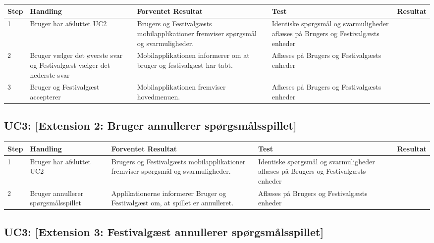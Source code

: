 \begin{longtable}{| p{0.7cm}  | p{3cm}  | p{4cm} |  p{3cm}  | p{3cm}  |}
\hline
Step & Handling & Forventet Resultat & Test & Resultat \\
\hline
1 &  Bruger har afsluttet UC2  &  Brugers og Festivalgæsts mobilapplikationer fremviser spørgsmål og svarmuligheder. & Identiske spørgsmål og svarmuligheder aflæses på Brugers og Festivalgæsts enheder & \FuckingHuge{\checkmark}\\
\hline
2 &  Bruger vælger det øverste svar og Festivalgæst vælger det nederste svar  & Mobilapplikationen informerer om at bruger og festivalgæst har tabt. & Aflæses på Brugers og Festivalgæsts enheder &  \FuckingHuge{\checkmark} \\
\hline
3 &  Bruger og Festivalgæst accepterer  & Mobilapplikationen fremviser hovedmenuen. & Aflæses på Brugers og Festivalgæsts enheder & \FuckingHuge{\checkmark} \\
\hline
\end{longtable}

\subsection{UC3: [Extension 2: Bruger annullerer spørgsmålsspillet]}

\begin{longtable}{| p{0.7cm}  | p{3cm}  | p{4cm} |  p{3cm}  | p{3cm}  |}
\hline
Step & Handling & Forventet Resultat & Test & Resultat \\
\hline
1 &  Bruger har afsluttet UC2  &  Brugers og Festivalgæsts mobilapplikationer fremviser spørgsmål og svarmuligheder. & Identiske spørgsmål og svarmuligheder aflæses på Brugers og Festivalgæsts enheder & \FuckingHuge{\checkmark} \\
\hline
2 &  Bruger annullerer spørgsmålsspillet  & Applikationerne informerer Bruger og Festivalgæst om, at spillet er annulleret. & Aflæses på Brugers og Festivalgæsts enheder &  \FuckingHuge{\textdiv}  \\
\hline
\end{longtable}

\newpage

\subsection{UC3: [Extension 3: Festivalgæst annullerer spørgsmålsspillet]}

